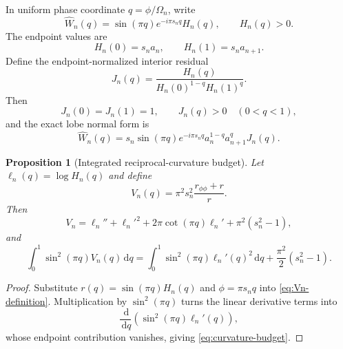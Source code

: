 \documentclass[11pt]{amsart}
\numberwithin{equation}{section}
\newtheorem{proposition}[theorem]{Proposition}
\theoremstyle{definition}
\theoremstyle{remark}
\newcommand{\dd}{\,\mathrm d}
\begin{document}
In uniform phase coordinate $q=\phi/\Omega_n$, write
\begin{equation}
\widehat W_n(q)
=\sin(\pi q)e^{-i\pi s_nq}H_n(q),
\qquad H_n(q)>0.
\label{eq:H-factorization}
\end{equation}
The endpoint values are
\begin{equation}
H_n(0)=s_na_n,
\qquad
H_n(1)=s_na_{n+1}.
\label{eq:H-endpoints}
\end{equation}
Define the endpoint-normalized interior residual
\begin{equation}
J_n(q)=\frac{H_n(q)}{H_n(0)^{1-q}H_n(1)^q}.
\label{eq:J-definition}
\end{equation}
Then
\begin{equation}
J_n(0)=J_n(1)=1,
\qquad J_n(q)>0\quad(0<q<1),
\label{eq:J-boundary}
\end{equation}
and the exact lobe normal form is
\begin{equation}
\widehat W_n(q)
=s_n\sin(\pi q)e^{-i\pi s_nq}
 a_n^{1-q}a_{n+1}^{q}J_n(q).
\label{eq:exact-lobe-normal-form}
\end{equation}

\begin{proposition}[Integrated reciprocal-curvature budget]
\label{prop:curvature-budget}
Let $\ell_n(q)=\log H_n(q)$ and define
\begin{equation}
V_n(q)=\pi^2s_n^2\frac{r_{\phi\phi}+r}{r}.
\label{eq:Vn-definition}
\end{equation}
Then
\begin{equation}
V_n
=\ell_n''+\ell_n'^2+2\pi\cot(\pi q)\ell_n'+\pi^2(s_n^2-1),
\label{eq:Vn-pointwise}
\end{equation}
and
\begin{equation}
\int_0^1\sin^2(\pi q)V_n(q)\dd q
=
\int_0^1\sin^2(\pi q)\ell_n'(q)^2\dd q
+\frac{\pi^2}{2}(s_n^2-1).
\label{eq:curvature-budget}
\end{equation}
\end{proposition}

\begin{proof}
Substitute $r(q)=\sin(\pi q)H_n(q)$ and $\phi=\pi s_nq$ into \eqref{eq:Vn-definition}.  Multiplication by $\sin^2(\pi q)$ turns the linear derivative terms into
\begin{equation}
\frac{\dd}{\dd q}\left(\sin^2(\pi q)\ell_n'(q)\right),
\label{eq:curvature-total-derivative}
\end{equation}
whose endpoint contribution vanishes, giving \eqref{eq:curvature-budget}.
\end{proof}
\end{document}
